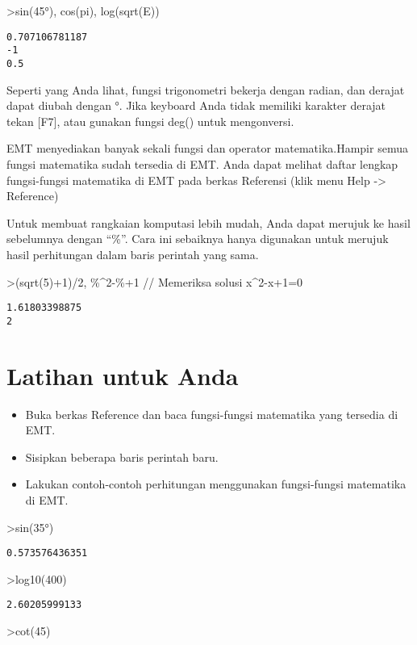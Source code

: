 \documentclass[
]{book}
\providecommand{\tightlist}{%
  \setlength{\itemsep}{0pt}\setlength{\parskip}{0pt}}
\begin{document}
\textgreater sin(45°), cos(pi), log(sqrt(E))

\begin{verbatim}
0.707106781187
-1
0.5
\end{verbatim}

Seperti yang Anda lihat, fungsi trigonometri bekerja dengan radian, dan derajat dapat diubah dengan °. Jika keyboard Anda tidak memiliki karakter derajat tekan {[}F7{]}, atau gunakan fungsi deg() untuk mengonversi.

EMT menyediakan banyak sekali fungsi dan operator matematika.Hampir semua fungsi matematika sudah tersedia di EMT. Anda dapat melihat daftar lengkap fungsi-fungsi matematika di EMT pada berkas Referensi (klik menu Help -\textgreater{} Reference)

Untuk membuat rangkaian komputasi lebih mudah, Anda dapat merujuk ke hasil sebelumnya dengan ``\%''. Cara ini sebaiknya hanya digunakan untuk merujuk hasil perhitungan dalam baris perintah yang sama.

\textgreater(sqrt(5)+1)/2, \%\^{}2-\%+1 // Memeriksa solusi x\^{}2-x+1=0

\begin{verbatim}
1.61803398875
2
\end{verbatim}

\section{Latihan untuk Anda}\label{latihan-untuk-anda-1}

\begin{itemize}
\tightlist
\item
  Buka berkas Reference dan baca fungsi-fungsi matematika yang tersedia di EMT.
\item
  Sisipkan beberapa baris perintah baru.
\item
  Lakukan contoh-contoh perhitungan menggunakan fungsi-fungsi matematika di EMT.
\end{itemize}

\textgreater sin(35°)

\begin{verbatim}
0.573576436351
\end{verbatim}

\textgreater log10(400)

\begin{verbatim}
2.60205999133
\end{verbatim}

\textgreater cot(45)
\end{document}
